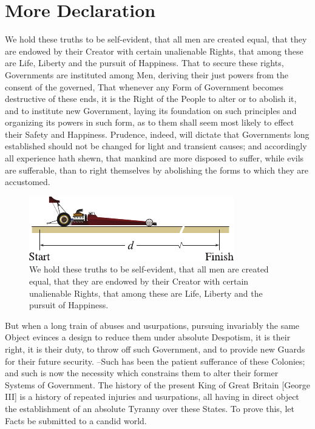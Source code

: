 \section{More Declaration}

We hold these truths to be self-evident, that all men are created equal,  that they are endowed by their Creator with certain unalienable Rights,  that among these are Life, Liberty and the pursuit of Happiness. That to secure these  rights, Governments are instituted among Men, deriving their just powers  from the consent of the governed, That whenever any Form of Government  becomes destructive of these ends, it is the Right of the People to alter  or to abolish it, and to institute new Government, laying its foundation on  such principles and organizing its powers in such form, as to them shall  seem most likely to effect their Safety and Happiness. Prudence, indeed, will dictate that Governments long established should not  be changed for light and transient causes; and accordingly all experience  hath shewn, that mankind are more disposed to suffer, while evils are  sufferable, than to right themselves by abolishing the forms to which they  are accustomed.
\begin{figure}[htb]
    \centering
    \includegraphics[scale=1.5]{Chapter-1/Figures/dragster}
    \caption{We hold these truths to be self-evident, that all men are created equal,  that they are endowed by their Creator with certain unalienable Rights,  that among these are Life, Liberty and the pursuit of Happiness.}
    \label{ChX-figure: FigureLabel3}
\end{figure}
But when a long train of abuses and usurpations, pursuing invariably the same  Object evinces a design to reduce them under absolute Despotism, it is their  right, it is their duty, to throw off such Government, and to provide new Guards for their future security. --Such has been the patient sufferance of these Colonies; and such is now the  necessity which constrains them to alter their former Systems of Government.  The history of the present King of Great Britain [George III] is a history  of repeated injuries and usurpations, all having in direct object the  establishment of an absolute Tyranny over these States. To prove this, let Facts be submitted to a candid world.


